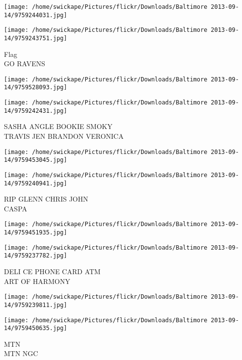 \documentclass[10pt,letterpaper]{article}
\begin{document}
\texttt{[image: /home/swickape/Pictures/flickr/Downloads/Baltimore 2013-09-14/9759244031.jpg]}

\vspace{0.25in}
\texttt{[image: /home/swickape/Pictures/flickr/Downloads/Baltimore 2013-09-14/9759243751.jpg]}

Flag\\
GO RAVENS\\
\pagebreak

\texttt{[image: /home/swickape/Pictures/flickr/Downloads/Baltimore 2013-09-14/9759528093.jpg]}

\vspace{0.25in}
\texttt{[image: /home/swickape/Pictures/flickr/Downloads/Baltimore 2013-09-14/9759242431.jpg]}

SASHA ANGLE BOOKIE SMOKY\\
TRAVIS JEN BRANDON VERONICA\\
\pagebreak

\texttt{[image: /home/swickape/Pictures/flickr/Downloads/Baltimore 2013-09-14/9759453045.jpg]}

\vspace{0.25in}
\texttt{[image: /home/swickape/Pictures/flickr/Downloads/Baltimore 2013-09-14/9759240941.jpg]}

RIP GLENN CHRIS JOHN\\
CASPA\\
\pagebreak

\texttt{[image: /home/swickape/Pictures/flickr/Downloads/Baltimore 2013-09-14/9759451935.jpg]}

\vspace{0.25in}
\texttt{[image: /home/swickape/Pictures/flickr/Downloads/Baltimore 2013-09-14/9759237782.jpg]}

DELI CE PHONE CARD ATM\\
ART OF HARMONY\\
\pagebreak

\texttt{[image: /home/swickape/Pictures/flickr/Downloads/Baltimore 2013-09-14/9759239811.jpg]}

\vspace{0.25in}
\texttt{[image: /home/swickape/Pictures/flickr/Downloads/Baltimore 2013-09-14/9759450635.jpg]}

MTN\\
MTN NGC\\
\pagebreak
\end{document}
